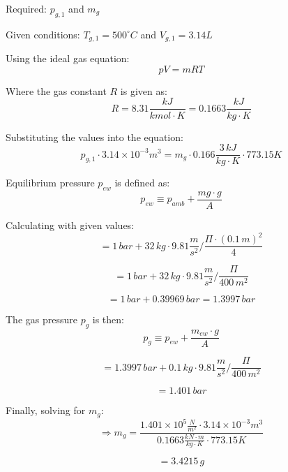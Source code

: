Required: \( p_{g,1} \) and \( m_g \)

Given conditions:
\( T_{g,1} = 500^\circ C \) and \( V_{g,1} = 3.14L \)

Using the ideal gas equation:
\[ pV = mRT \]

Where the gas constant \( R \) is given as:
\[ R = 8.31 \frac{kJ}{kmol \cdot K} = 0.1663 \frac{kJ}{kg \cdot K} \]

Substituting the values into the equation:
\[ p_{g,1} \cdot 3.14 \times 10^{-3} m^3 = m_g \cdot 0.166 \frac{3 \, kJ}{kg \cdot K} \cdot 773.15 K \]

Equilibrium pressure \( p_{ew} \) is defined as:
\[ p_{ew} \equiv p_{amb} + \frac{mg \cdot g}{A} \]

Calculating with given values:
\[ = 1 \, bar + 32 \, kg \cdot 9.81 \frac{m}{s^2} / \frac{\Pi \cdot (0.1 \, m)^2}{4} \]

\[ = 1 \, bar + 32 \, kg \cdot 9.81 \frac{m}{s^2} / \frac{\Pi}{400 \, m^2} \]

\[ = 1 \, bar + 0.39969 \, bar = 1.3997 \, bar \]

The gas pressure \( p_g \) is then:
\[ p_g \equiv p_{ew} + \frac{m_{ew} \cdot g}{A} \]

\[ = 1.3997 \, bar + 0.1 \, kg \cdot 9.81 \frac{m}{s^2} / \frac{\Pi}{400 \, m^2} \]

\[ = 1.401 \, bar \]

Finally, solving for \( m_g \):
\[ \Rightarrow m_g = \frac{1.401 \times 10^5 \frac{N}{m^2} \cdot 3.14 \times 10^{-3} m^3}{0.1663 \frac{kN \cdot m}{kg \cdot K} \cdot 773.15 K} \]

\[ = 3.4215 \, g \]